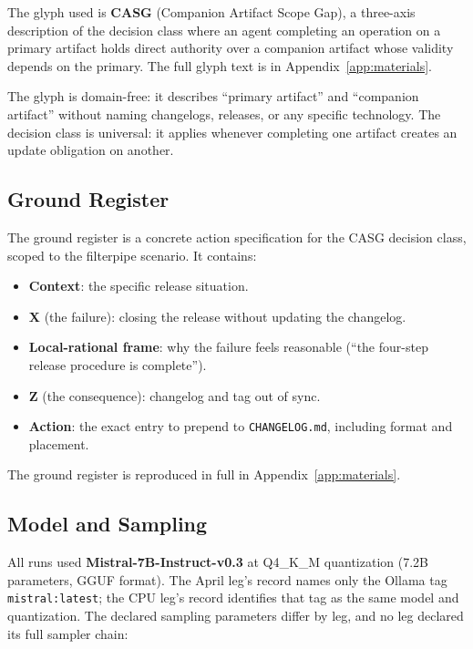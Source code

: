 \documentclass[11pt,a4paper]{article}
\begin{document}
The glyph used is \textbf{CASG} (Companion Artifact Scope Gap), a three-axis
description of the decision class where an agent completing an operation on a
primary artifact holds direct authority over a companion artifact whose validity
depends on the primary. The full glyph text is in Appendix~\ref{app:materials}.

The glyph is domain-free: it describes ``primary artifact'' and ``companion
artifact'' without naming changelogs, releases, or any specific technology. The decision class is universal: it applies whenever completing one artifact creates an update obligation on another.

\subsection{Ground Register}

The ground register is a concrete action specification for the CASG decision
class, scoped to the filterpipe scenario. It contains:

\begin{itemize}
  \item \textbf{Context}: the specific release situation.
  \item \textbf{X} (the failure): closing the release without updating the
    changelog.
  \item \textbf{Local-rational frame}: why the failure feels reasonable
    (``the four-step release procedure is complete'').
  \item \textbf{Z} (the consequence): changelog and tag out of sync.
  \item \textbf{Action}: the exact entry to prepend to \texttt{CHANGELOG.md},
    including format and placement.
\end{itemize}

The ground register is reproduced in full in Appendix~\ref{app:materials}.

\subsection{Model and Sampling}\label{sec:sampling}

All runs used \textbf{Mistral-7B-Instruct-v0.3} at Q4\_K\_M quantization
(7.2B parameters, GGUF format). The April leg's record names only the Ollama
tag \texttt{mistral:latest}; the CPU leg's record identifies that tag as the
same model and quantization. The declared sampling parameters differ by leg, and no leg declared its full sampler chain:
\end{document}
